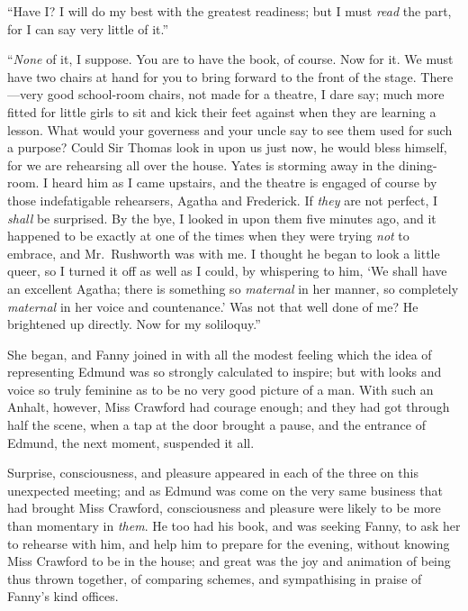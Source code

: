 ``Have I?  I will do my best with the greatest readiness;
but I must \emph{read} the part, for I can say very little
of it.''

``\emph{None} of it, I suppose.  You are to have the book,
of course.  Now for it.  We must have two chairs at hand
for you to bring forward to the front of the stage.
There---very good school-room chairs, not made for a theatre,
I dare say; much more fitted for little girls to sit and
kick their feet against when they are learning a lesson.
What would your governess and your uncle say to see them
used for such a purpose?  Could Sir Thomas look in upon us
just now, he would bless himself, for we are rehearsing
all over the house.  Yates is storming away in the
dining-room. I heard him as I came upstairs, and the theatre
is engaged of course by those indefatigable rehearsers,
Agatha and Frederick.  If \emph{they} are not perfect,
I \emph{shall} be surprised.  By the bye, I looked in upon
them five minutes ago, and it happened to be exactly at
one of the times when they were trying \emph{not} to embrace,
and Mr.\ Rushworth was with me.  I thought he began to look
a little queer, so I turned it off as well as I could,
by whispering to him, `We shall have an excellent Agatha;
there is something so \emph{maternal} in her manner,
so completely \emph{maternal} in her voice and countenance.'
Was not that well done of me?  He brightened up directly.
Now for my soliloquy.''

She began, and Fanny joined in with all the modest feeling
which the idea of representing Edmund was so strongly
calculated to inspire; but with looks and voice so truly
feminine as to be no very good picture of a man.  With such
an Anhalt, however, Miss Crawford had courage enough;
and they had got through half the scene, when a tap at
the door brought a pause, and the entrance of Edmund,
the next moment, suspended it all.

Surprise, consciousness, and pleasure appeared in each
of the three on this unexpected meeting; and as Edmund
was come on the very same business that had brought
Miss Crawford, consciousness and pleasure were likely
to be more than momentary in \emph{them}.  He too had his book,
and was seeking Fanny, to ask her to rehearse with him,
and help him to prepare for the evening, without knowing
Miss Crawford to be in the house; and great was the joy and
animation of being thus thrown together, of comparing schemes,
and sympathising in praise of Fanny's kind offices.


